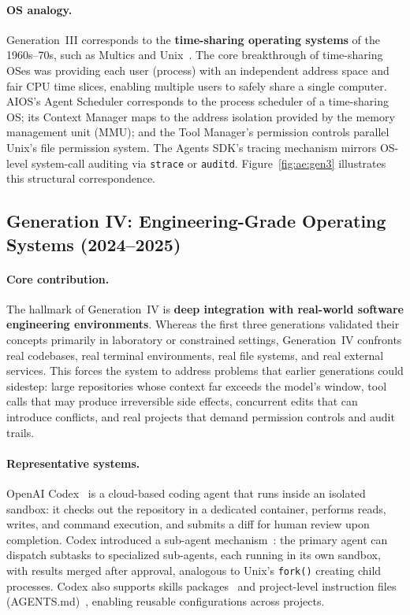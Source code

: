 \paragraph{OS analogy.}
Generation~III corresponds to the \textbf{time-sharing operating systems} of the 1960s--70s, such as Multics and Unix~\cite{ostep_2023}.
The core breakthrough of time-sharing OSes was providing each user (process) with an independent address space and fair CPU time slices, enabling multiple users to safely share a single computer.
AIOS's Agent Scheduler corresponds to the process scheduler of a time-sharing OS; its Context Manager maps to the address isolation provided by the memory management unit (MMU); and the Tool Manager's permission controls parallel Unix's file permission system.
The Agents SDK's tracing mechanism mirrors OS-level system-call auditing via \texttt{strace} or \texttt{auditd}.
Figure~\ref{fig:ae:gen3} illustrates this structural correspondence.


\subsection{Generation IV: Engineering-Grade Operating Systems (2024--2025)}

\paragraph{Core contribution.}
The hallmark of Generation~IV is \textbf{deep integration with real-world software engineering environments}.
Whereas the first three generations validated their concepts primarily in laboratory or constrained settings, Generation~IV confronts real codebases, real terminal environments, real file systems, and real external services.
This forces the system to address problems that earlier generations could sidestep: large repositories whose context far exceeds the model's window, tool calls that may produce irreversible side effects, concurrent edits that can introduce conflicts, and real projects that demand permission controls and audit trails.

\paragraph{Representative systems.}
OpenAI Codex~\cite{openai_codex_overview_2026} is a cloud-based coding agent that runs inside an isolated sandbox: it checks out the repository in a dedicated container, performs reads, writes, and command execution, and submits a diff for human review upon completion.
Codex introduced a sub-agent mechanism~\cite{openai_codex_overview_2026}: the primary agent can dispatch subtasks to specialized sub-agents, each running in its own sandbox, with results merged after approval, analogous to Unix's \texttt{fork()} creating child processes.
Codex also supports skills packages~\cite{openai_codex_skills_2026} and project-level instruction files (AGENTS.md)~\cite{openai_codex_agents_md_2026}, enabling reusable configurations across projects.

